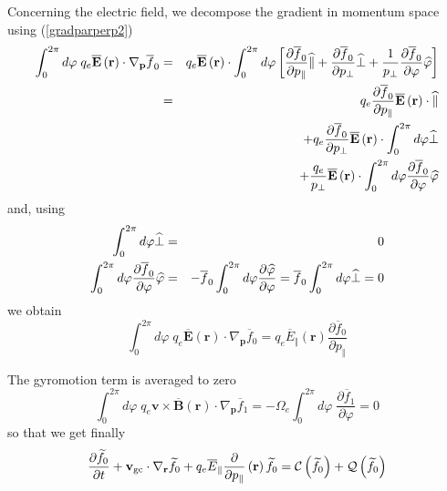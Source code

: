 Concerning the electric field, we decompose the gradient in momentum space
using (\ref{gradparperp2})
\begin{eqnarray}
\int_{0}^{2\pi }d\varphi \;q_{e}\overline{\mathbf{E}}\left( \mathbf{r}
\right) \cdot \nabla _{\mathbf{p}}\overline{f}_{0} &=&q_{e}\overline{\mathbf{%
E}}\left( \mathbf{r}\right) \cdot \int_{0}^{2\pi }d\varphi \left[ \frac{%
\partial \overline{f}_{0}}{\partial p_{\Vert }}\widehat{\Vert }+\frac{%
\partial \overline{f}_{0}}{\partial p_{\bot }}\widehat{\bot }+\frac{1}{%
p_{\bot }}\frac{\partial \overline{f}_{0}}{\partial \varphi }\widehat{%
\varphi }\right] \\
&=&q_{e}\frac{\partial \overline{f}_{0}}{\partial p_{\Vert }}\overline{%
\mathbf{E}}\left( \mathbf{r}\right) \cdot \widehat{\Vert }  \nonumber \\
&&+q_{e}\frac{\partial \overline{f}_{0}}{\partial p_{\bot }}\overline{%
\mathbf{E}}\left( \mathbf{r}\right) \cdot \int_{0}^{2\pi }d\varphi \widehat{%
\bot }  \nonumber \\
&&+\frac{q_{e}}{p_{\bot }}\overline{\mathbf{E}}\left( \mathbf{r}\right)
\cdot \int_{0}^{2\pi }d\varphi \frac{\partial \overline{f}_{0}}{\partial
\varphi }\widehat{\varphi }
\end{eqnarray}
and, using
\begin{eqnarray}
\int_{0}^{2\pi }d\varphi \widehat{\bot } &=&0 \\
\int_{0}^{2\pi }d\varphi \frac{\partial \overline{f}_{0}}{\partial \varphi }%
\widehat{\varphi } &=&-\overline{f}_{0}\int_{0}^{2\pi }d\varphi \frac{%
\partial \widehat{\varphi }}{\partial \varphi }=\overline{f}%
_{0}\int_{0}^{2\pi }d\varphi \widehat{\bot }=0
\end{eqnarray}
we obtain
\begin{equation}
\int_{0}^{2\pi }d\varphi \;q_{e}\overline{\mathbf{E}}\left( \mathbf{r}%
\right) \cdot \nabla _{\mathbf{p}}\overline{f}_{0}=q_{e}\overline{E}_{\Vert
}\left( \mathbf{r}\right) \frac{\partial \overline{f}_{0}}{\partial p_{\Vert
}}
\end{equation}

The gyromotion term is averaged to zero
\begin{equation}
\int_{0}^{2\pi }d\varphi \;q_{e}\mathbf{v}\times \overline{\mathbf{B}}\left(
\mathbf{r}\right) \cdot \nabla _{\mathbf{p}}\overline{f}_{1}=-\Omega %
_{e}\int_{0}^{2\pi }d\varphi \;\frac{\partial \overline{f}_{1}}{\partial %
\varphi }=0
\end{equation}
so that we get finally
\begin{equation}
\frac{\partial \widetilde{f}_{0}}{\partial t}+\mathbf{v}_{\text{gc}}\cdot %
\nabla _{\mathbf{r}}\widetilde{f}_{0}+q_{e}\overline{E}_{\Vert }\frac{%
\partial }{\partial p_{\Vert }}\left( \mathbf{r}\right) \widetilde{f}_{0}=%
\mathcal{C}\left( \widetilde{f}_{0}\right) +\mathcal{Q}\left( \widetilde{f}%
_{0}\right)
\end{equation}

